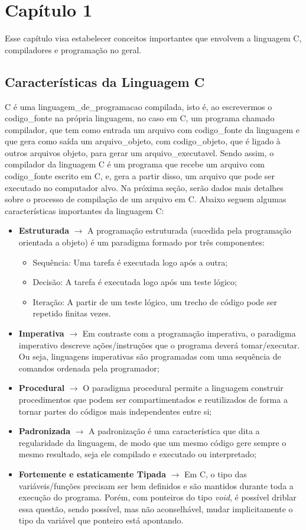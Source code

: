 \chapter{Capítulo 1}
Esse capítulo visa estabelecer conceitos importantes que envolvem a linguagem C, compiladores e programação no geral.

\section{Características da Linguagem C}
C é uma \gls{linguagem_de_programacao} compilada, isto é, ao escrevermos o \gls{codigo_fonte} na própria linguagem, no caso em C, um programa chamado compilador, que tem como entrada um arquivo com \gls{codigo_fonte} da linguagem e que gera como saída um \gls{arquivo_objeto}, com \gls{codigo_objeto}, que é ligado à outros arquivos objeto, para gerar um \gls{arquivo_executavel}. Sendo assim, o compilador da linguagem C é um programa que recebe um arquivo com \gls{codigo_fonte} escrito em C, e, gera a partir disso, um arquivo que pode ser executado no computador alvo. Na próxima seção, serão dados mais detalhes sobre o processo de compilação de um arquivo em C. Abaixo seguem algumas características importantes da linguagem C:
\begin{itemize}
    \item \textbf{Estruturada} $\rightarrow$ A programação estruturada (sucedida pela programação orientada a objeto) é um paradigma formado por três componentes:
    \begin{itemize}
        \item Sequência: Uma tarefa é executada logo após a outra;
        \item Decisão: A tarefa é executada logo após um teste lógico;
        \item Iteração: A partir de um teste lógico, um trecho de código pode ser repetido finitas vezes.
    \end{itemize}
    \item \textbf{Imperativa} $\rightarrow$ Em contraste com a programação imperativa, o paradigma imperativo descreve ações/instruções que o programa deverá tomar/executar. Ou seja, linguagens imperativas são programadas com uma sequência de comandos ordenada pela programador;
    \item \textbf{Procedural} $\rightarrow$ O paradigma procedural permite a linguagem construir procedimentos que podem ser compartimentados e reutilizados de forma a tornar partes do códigos mais independentes entre si;
    \item \textbf{Padronizada} $\rightarrow$ A padronização é uma característica que dita a regularidade da linguagem, de modo que um mesmo código gere sempre o mesmo resultado, seja ele compilado e executado ou interpretado;
    \item \textbf{Fortemente e estaticamente Tipada} $\rightarrow$ Em C, o tipo das variáveis/funções precisam ser bem definidos e são mantidos durante toda a execução do programa. Porém, com ponteiros do tipo \textit{void}, é possível driblar essa questão, sendo possível, mas não aconselhável, mudar implicitamente o tipo da variável que ponteiro está apontando.
\end{itemize}

